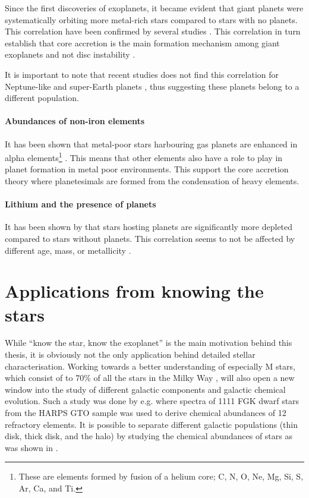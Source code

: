Since the first discoveries of exoplanets, it became evident that giant planets were systematically
orbiting more metal-rich stars compared to stars with no planets. This correlation have been
confirmed by several studies \citep{Gonzalez1997,Santos2004,Fischer2005,Sousa2008a,Mortier2013b}.
This correlation in turn establish that core accretion is the main formation mechanism among giant
exoplanets \citep{Pollack1996,Ida2004,Mordasini2012} and not disc instability \citep{Boss2002}.

It is important to note that recent studies does not find this correlation for Neptune-like and
super-Earth planets \citep{Sousa2011,Buchhave2012}, thus suggesting these planets belong to a
different population.

\paragraph{Abundances of non-iron elements}

It has been shown that metal-poor stars harbouring gas planets are enhanced in alpha
elements\footnote{These are elements formed by fusion of a helium core; C, N, O, Ne, Mg, Si, S, Ar,
Ca, and Ti.} \citep[see e.g.]{Adibekyan2012a}. This means that other elements also have a role to
play in planet formation in metal poor environments. This support the core accretion theory where
planetesimals are formed from the condensation of heavy elements.


\paragraph{Lithium and the presence of planets}

It has been shown by \citep{Israelian2004,Delgado2014} that stars hosting planets are significantly
more  depleted compared to stars without planets. This correlation seems to not be
affected by different age, mass, or metallicity \citep{Sousa2010}.



\section{Applications from knowing the stars}
\label{sec:stars_application}

While ``know the star, know the exoplanet'' is the main motivation behind this thesis, it is
obviously not the only application behind detailed stellar characterisation. Working towards a
better understanding of especially M stars, which consist of to 70\% of all the stars in the Milky
Way \citep{Bochanski2010}, will also open a new window into the study of different galactic
components and galactic chemical evolution. Such a study was done by e.g. \citet{Adibekyan2012}
where spectra of 1111 FGK dwarf stars from the HARPS GTO sample was used to derive chemical
abundances of 12 refractory elements. It is possible to separate different galactic populations
(thin disk, thick disk, and the halo) by studying the chemical abundances of stars as was shown in
\citet{Adibekyan2012}.

